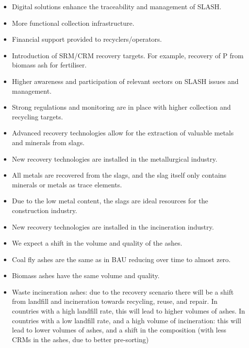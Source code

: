 \begin{itemize}
   \item Digital solutions enhance the traceability and management of SLASH.
   \item More functional collection infrastructure.
   \item Financial support provided to recyclers/operators.
   \item Introduction of SRM/CRM recovery targets. For example, recovery of P from biomass ash for fertiliser.
   \item Higher awareness and participation of relevant sectors on SLASH issues and management.
   \item Strong regulations and monitoring are in place with higher collection and recycling targets.
 \end{itemize}

\begin{itemize}
\item Advanced recovery technologies allow for the extraction of valuable metals and minerals from slags.
\item New recovery technologies are installed in the metallurgical industry. 
\item All metals are recovered from the slags, and the slag itself only contains minerals or metals as trace elements.
\item Due to the low metal content, the slags are ideal resources for the construction industry.
\end{itemize}

\begin{itemize}
\item New recovery technologies are installed in the incineration industry.
\item We expect a shift in the volume and quality of the ashes.
\item Coal fly ashes are the same as in BAU reducing over time to almost zero.
\item Biomass ashes have the same volume and quality.
\item Waste incineration ashes: due to the recovery scenario there will be a shift from landfill and incineration towards recycling,  reuse, and repair. In countries with a high landfill rate, this will lead to higher volumes of ashes. In countries with a low landfill rate, and a high volume of incineration: this will lead to lower volumes of ashes, and a shift in the composition (with less CRMs in the ashes, due to better pre-sorting)
\end{itemize}
